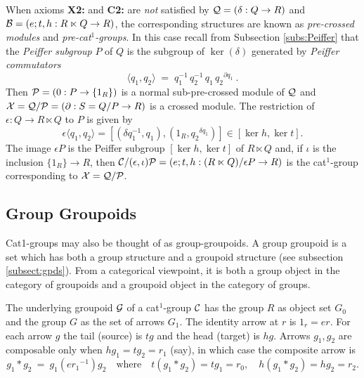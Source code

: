 When axioms \textbf{X2:} and \textbf{C2:} are \emph{not} satisfied
by  $\mathcal{Q} = (\delta : Q \to R)$  and  
$\mathcal{B} = (e;t,h : R \ltimes Q \to R)$,
the corresponding structures are known as \emph{pre-crossed modules}
and \emph{pre-cat$^1$-groups}.
In this case recall from Subsection \ref{subs:Peiffer}
that the \emph{Peiffer subgroup}  $P$  of  $Q$  is the subgroup of
$\ker(\delta)$  generated by \emph{Peiffer commutators}
$$
\langle q_1, q_2 \rangle 
\;=\; 
q_1^{-1}\,q_2^{-1}\,q_1\,{q_2}^{\partial q_1}~.
$$
Then  $\mathcal{P} = (0 : P \to \{1_R\})$  
is a normal sub-pre-crossed module of  $\mathcal{Q}$  and  
$\mathcal{X} = \mathcal{Q}/\mathcal{P} = (\partial : S=Q/P \to R)$  is a crossed module.
The restriction of  $\epsilon : Q \to R \ltimes Q$  to  $P$  is given by
$$
   \epsilon \langle q_1, q_2 \rangle
 = [ (\delta q_1^{-1}, q_1), (1_R, {q_2}^{\delta q_1}) ]
 \in  [ \ker h, \ker t ].
$$
The image  $\epsilon P$  is the Peiffer subgroup
$[\ker h, \ker t]$  of  $R \ltimes Q$
and, if  $\iota$  is the inclusion  $\{ 1_R \} \to R$,  then
$\mathcal{C}/(\epsilon,\iota)\mathcal{P} = 
 (e;t,h : (R \ltimes Q) / \epsilon P \to R)$
is the cat$^1$-group corresponding to  $\mathcal{X} = \mathcal{Q}/\mathcal{P}$.



\subsection{Group Groupoids} \label{subs:gpgpd}  

Cat1-groups may also be thought of as group-groupoids.
A group groupoid is a set which has both a group structure and
a groupoid structure (see subsection \ref{subsect:gpds}). 
From a categorical viewpoint, it is both a group object in the
category of groupoids and a groupoid object in the category of groups.

The underlying groupoid $\mathcal{G}$  of a cat$^1$-group  $\mathcal{C}$ 
has the group $R$ as object set $G_0$ 
and the group $G$ as the set of arrows $G_1$. 
The identity arrow at  $r$  is  $1_r = er$. 
For each arrow  $g$  the tail (source) is  $tg$ and the head (target) is $hg$. 
Arrows  $g_1,g_2$  are composable only when  $hg_1 = tg_2 = r_1$ (say),
in which case the composite arrow is
\begin{equation} \label{eq:gpgpd-comp}
g_1 * g_2 ~=~ g_1(e{r_1}^{-1})g_2 
\quad\mbox{where}\quad
t(g_1 * g_2) = tg_1 = r_0, \quad
h(g_1 * g_2) = hg_2 = r_2.
\end{equation}

